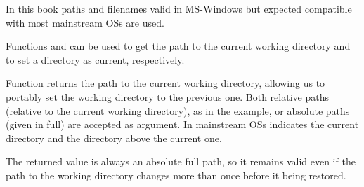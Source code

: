 \documentclass[krantz2]{krantz}\usepackage{knitr}%
\begin{document}
\begin{warningbox}
In this book paths and filenames valid in MS-Windows but expected compatible with most mainstream OSs are used.
\end{warningbox}

Functions  and  can be used to get the path to the current working directory and to set a directory as current, respectively.
\begin{knitrout}\footnotesize
{}\color{fgcolor}\begin{kframe}
\begin{alltt}
\hlstd{()}
\end{alltt}
\end{kframe}
\end{knitrout}

Function  returns the path to the current working directory, allowing us to portably set the working directory to the previous one. Both relative paths (relative to the current working directory), as in the example, or absolute paths (given in full) are accepted as argument. In mainstream OSs  indicates the current directory and  the directory above the current one.
\begin{knitrout}\footnotesize
{}\color{fgcolor}\begin{kframe}
\begin{alltt}
 \hlkwb{<-} \hlstd{(}\hlstd{)}
\hlstd{()}
\end{alltt}
\end{kframe}
\end{knitrout}

The returned value is always an absolute full path, so it remains valid even if the path to the working directory changes more than once before it being restored.
\begin{knitrout}\footnotesize
{}\color{fgcolor}\begin{kframe}
\begin{alltt}
\hlstd{()}
\end{alltt}
\end{kframe}
\end{knitrout}
\end{document}
